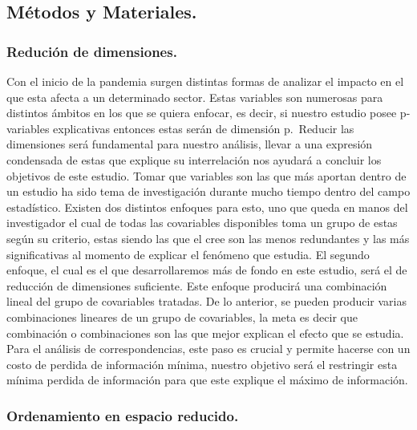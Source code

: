 \hypertarget{muxe9todos-y-materiales.}{%
\subsection{Métodos y Materiales.}\label{muxe9todos-y-materiales.}}

\hypertarget{reduciuxf3n-de-dimensiones.}{%
\subsubsection{Redución de
dimensiones.}\label{reduciuxf3n-de-dimensiones.}}

Con el inicio de la pandemia surgen distintas formas de analizar el
impacto en el que esta afecta a un determinado sector. Estas variables
son numerosas para distintos ámbitos en los que se quiera enfocar, es
decir, si nuestro estudio posee p-variables explicativas entonces estas
serán de dimensión p.~Reducir las dimensiones será fundamental para
nuestro análisis, llevar a una expresión condensada de estas que
explique su interrelación nos ayudará a concluir los objetivos de este
estudio. Tomar que variables son las que más aportan dentro de un
estudio ha sido tema de investigación durante mucho tiempo dentro del
campo estadístico. Existen dos distintos enfoques para esto, uno que
queda en manos del investigador el cual de todas las covariables
disponibles toma un grupo de estas según su criterio, estas siendo las
que el cree son las menos redundantes y las más significativas al
momento de explicar el fenómeno que estudia. El segundo enfoque, el cual
es el que desarrollaremos más de fondo en este estudio, será el de
reducción de dimensiones suficiente. Este enfoque producirá una
combinación lineal del grupo de covariables tratadas. De lo anterior, se
pueden producir varias combinaciones lineares de un grupo de
covariables, la meta es decir que combinación o combinaciones son las
que mejor explican el efecto que se estudia. Para el análisis de
correspondencias, este paso es crucial y permite hacerse con un costo de
perdida de información mínima, nuestro objetivo será el restringir esta
mínima perdida de información para que este explique el máximo de
información.

\hypertarget{ordenamiento-en-espacio-reducido.}{%
\subsubsection{Ordenamiento en espacio
reducido.}\label{ordenamiento-en-espacio-reducido.}}

